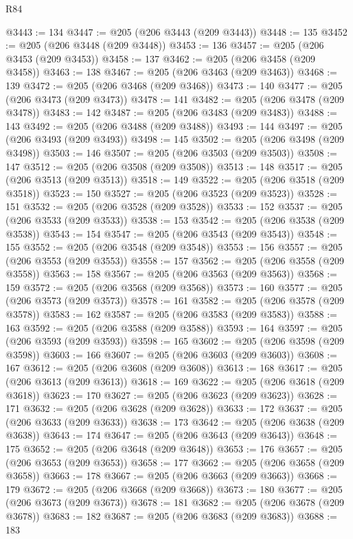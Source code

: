 \begin{lexlean}{R84}
\begin{coremodule}
@3443 := 134
@3447 := @205 (@206 @3443 (@209 @3443))
@3448 := 135
@3452 := @205 (@206 @3448 (@209 @3448))
@3453 := 136
@3457 := @205 (@206 @3453 (@209 @3453))
@3458 := 137
@3462 := @205 (@206 @3458 (@209 @3458))
@3463 := 138
@3467 := @205 (@206 @3463 (@209 @3463))
@3468 := 139
@3472 := @205 (@206 @3468 (@209 @3468))
@3473 := 140
@3477 := @205 (@206 @3473 (@209 @3473))
@3478 := 141
@3482 := @205 (@206 @3478 (@209 @3478))
@3483 := 142
@3487 := @205 (@206 @3483 (@209 @3483))
@3488 := 143
@3492 := @205 (@206 @3488 (@209 @3488))
@3493 := 144
@3497 := @205 (@206 @3493 (@209 @3493))
@3498 := 145
@3502 := @205 (@206 @3498 (@209 @3498))
@3503 := 146
@3507 := @205 (@206 @3503 (@209 @3503))
@3508 := 147
@3512 := @205 (@206 @3508 (@209 @3508))
@3513 := 148
@3517 := @205 (@206 @3513 (@209 @3513))
@3518 := 149
@3522 := @205 (@206 @3518 (@209 @3518))
@3523 := 150
@3527 := @205 (@206 @3523 (@209 @3523))
@3528 := 151
@3532 := @205 (@206 @3528 (@209 @3528))
@3533 := 152
@3537 := @205 (@206 @3533 (@209 @3533))
@3538 := 153
@3542 := @205 (@206 @3538 (@209 @3538))
@3543 := 154
@3547 := @205 (@206 @3543 (@209 @3543))
@3548 := 155
@3552 := @205 (@206 @3548 (@209 @3548))
@3553 := 156
@3557 := @205 (@206 @3553 (@209 @3553))
@3558 := 157
@3562 := @205 (@206 @3558 (@209 @3558))
@3563 := 158
@3567 := @205 (@206 @3563 (@209 @3563))
@3568 := 159
@3572 := @205 (@206 @3568 (@209 @3568))
@3573 := 160
@3577 := @205 (@206 @3573 (@209 @3573))
@3578 := 161
@3582 := @205 (@206 @3578 (@209 @3578))
@3583 := 162
@3587 := @205 (@206 @3583 (@209 @3583))
@3588 := 163
@3592 := @205 (@206 @3588 (@209 @3588))
@3593 := 164
@3597 := @205 (@206 @3593 (@209 @3593))
@3598 := 165
@3602 := @205 (@206 @3598 (@209 @3598))
@3603 := 166
@3607 := @205 (@206 @3603 (@209 @3603))
@3608 := 167
@3612 := @205 (@206 @3608 (@209 @3608))
@3613 := 168
@3617 := @205 (@206 @3613 (@209 @3613))
@3618 := 169
@3622 := @205 (@206 @3618 (@209 @3618))
@3623 := 170
@3627 := @205 (@206 @3623 (@209 @3623))
@3628 := 171
@3632 := @205 (@206 @3628 (@209 @3628))
@3633 := 172
@3637 := @205 (@206 @3633 (@209 @3633))
@3638 := 173
@3642 := @205 (@206 @3638 (@209 @3638))
@3643 := 174
@3647 := @205 (@206 @3643 (@209 @3643))
@3648 := 175
@3652 := @205 (@206 @3648 (@209 @3648))
@3653 := 176
@3657 := @205 (@206 @3653 (@209 @3653))
@3658 := 177
@3662 := @205 (@206 @3658 (@209 @3658))
@3663 := 178
@3667 := @205 (@206 @3663 (@209 @3663))
@3668 := 179
@3672 := @205 (@206 @3668 (@209 @3668))
@3673 := 180
@3677 := @205 (@206 @3673 (@209 @3673))
@3678 := 181
@3682 := @205 (@206 @3678 (@209 @3678))
@3683 := 182
@3687 := @205 (@206 @3683 (@209 @3683))
@3688 := 183

\end{coremodule}
\end{lexlean}
